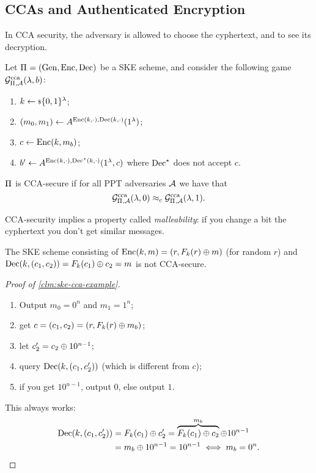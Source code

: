 \subsection{\aclp{CCA} and Authenticated Encryption}

In \ac{CCA} security, the adversary is allowed to choose the cyphertext, and to see its decryption.

\begin{definition}
	Let $\Pi_{} = \left( \mathrm{Gen} , \allowbreak \mathrm{Enc} , \allowbreak \mathrm{Dec} \right)$ be a \ac{SKE} scheme, and consider the following game $\mathcal{G}^{\scriptstyle \text{cca}}_{\Pi_{},\mathcal{A}}(\lambda, b)$:
	\begin{enumerate}
		\item $k \leftarrow {\scriptstyle \$} {\{0,1\}^{\lambda}}$;
		\item $(m_0, m_1) \leftarrow A^{\mathrm{Enc}(k, \cdot), \mathrm{Dec}(k, \cdot)} (1^{\lambda})$;
		\item $c \leftarrow \mathrm{Enc}(k, m_b)$;
		\item $b' \leftarrow A^{\mathrm{Enc}(k, \cdot), \mathrm{Dec}^{\star}(k, \cdot)} (1^{\lambda}, c)$ where $\mathrm{Dec}^{\star}$ does not accept $c$.
	\end{enumerate}
	$\Pi_{}$ is \ac{CCA}-secure if for all \ac{PPT} adversaries $\mathcal{A}$ we have that
	\begin{equation*}
		\mathcal{G}^{\scriptstyle \text{cca}}_{\Pi_{},\mathcal{A}}(\lambda, 0) \approx_c \mathcal{G}^{\scriptstyle \text{cca}}_{\Pi_{},\mathcal{A}}(\lambda, 1). \qedhere
	\end{equation*}
\end{definition}

\ac{CCA}-security implies a property called \emph{malleability}: if you change a bit the cyphertext you don't get similar messages.

\begin{claim} \label{clm:ske-cca-example}
	The \ac{SKE} scheme consisting of $\mathrm{Enc}(k, m) = (r, F_k(r) \oplus m)$ (for random $r$) and $\mathrm{Dec}(k, (c_1, c_2)) = F_k(c_1) \oplus c_2 = m$ is not \ac{CCA}-secure.
\end{claim}

\begin{proof}[Proof of \cref{clm:ske-cca-example}]
	\begin{enumerate}
		\item Output $m_0 = 0^n$ and $m_1 = 1^n$;
		\item get $c = (c_1, c_2) = (r, F_k(r) \oplus m_b)$;
		\item let $c_2' = c_2 \oplus 10^{n-1}$;
		\item query $\mathrm{Dec}(k, (c_1, c_2'))$ (which is different from $c$);
		\item if you get $10^{n-1}$, output $0$, else output $1$.
	\end{enumerate}
	This always works:
	\begin{align*}
		\mathrm{Dec}(k, (c_1, c_2'))
		& =
		F_k(c_1) \oplus c_2'
		=
		\overbrace{F_k(c_1) \oplus c_2}^{m_b} \oplus 10^{n-1} 
		\\
		& =
		m_b \oplus 10^{n-1}
		= 10^{n-1}
		\iff
		m_b = 0^n.
	\end{align*}
\end{proof}

